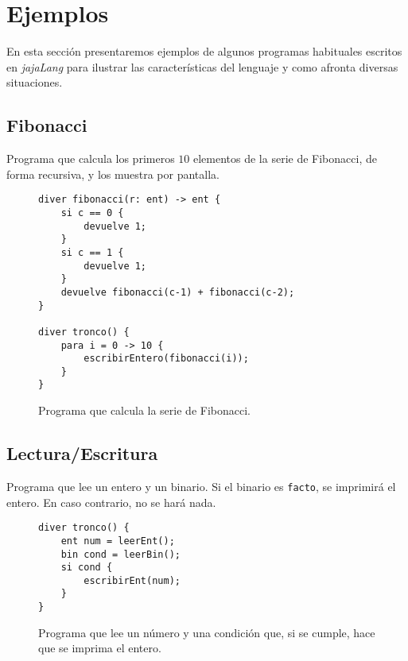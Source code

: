 \section{Ejemplos}
En esta sección presentaremos ejemplos de algunos programas habituales escritos
en \textit{jajaLang} para ilustrar las características del lenguaje y como
afronta diversas situaciones.

\subsection{Fibonacci}
Programa que calcula los primeros $10$ elementos de la serie de Fibonacci, de forma
recursiva, y los muestra por pantalla.
\begin{figure}[htbp]
    \centering
    \begin{lstlisting}
diver fibonacci(r: ent) -> ent {
    si c == 0 {
        devuelve 1; 
    }
    si c == 1 {
        devuelve 1;
    }
    devuelve fibonacci(c-1) + fibonacci(c-2);
}

diver tronco() {
    para i = 0 -> 10 {
        escribirEntero(fibonacci(i));
    } 
}
    \end{lstlisting}
    \caption{Programa que calcula la serie de Fibonacci.}
\end{figure}

\subsection{Lectura/Escritura}
Programa que lee un entero y un binario. Si el binario es \lstinline{facto}, se
imprimirá el entero. En caso contrario, no se hará nada.
\begin{figure}[htbp]
    \centering
    \begin{lstlisting}
diver tronco() {
    ent num = leerEnt();
    bin cond = leerBin();
    si cond {
        escribirEnt(num);
    }
}
    \end{lstlisting}
    \caption{Programa que lee un número y una condición que, si se cumple, hace
    que se imprima el entero.}
\end{figure}

